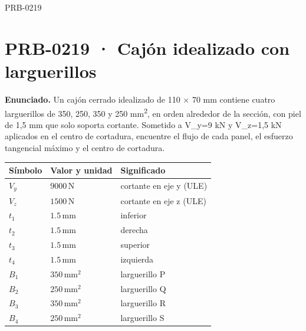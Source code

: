 \begin{studiumworked}{PRB-0219}

\section{PRB-0219 · Cajón idealizado con larguerillos}

\textbf{Enunciado.} Un cajón cerrado idealizado de 110 \ensuremath{\times} 70 mm contiene cuatro larguerillos de 350, 250, 350 y 250 mm\textsuperscript{2}, en orden alrededor de la sección, con piel de 1,5 mm que solo soporta cortante. Sometido a V\_y=9 kN y V\_z=1,5 kN aplicados en el centro de cortadura, encuentre el flujo de cada panel, el esfuerzo tangencial máximo y el centro de cortadura.

\par\medskip\noindent\begin{tabular}{@{}p{.18\linewidth}p{.26\linewidth}p{.48\linewidth}@{}}
\toprule Símbolo & Valor y unidad & Significado\\\midrule
$V_{y}$ & $9000\,\mathrm{N}$ & cortante en eje y (ULE)\\
$V_{z}$ & $1500\,\mathrm{N}$ & cortante en eje z (ULE)\\
$t_{1}$ & $1.5\,\mathrm{mm}$ & inferior\\
$t_{2}$ & $1.5\,\mathrm{mm}$ & derecha\\
$t_{3}$ & $1.5\,\mathrm{mm}$ & superior\\
$t_{4}$ & $1.5\,\mathrm{mm}$ & izquierda\\
$B_{1}$ & $350\,\mathrm{mm^2}$ & larguerillo P\\
$B_{2}$ & $250\,\mathrm{mm^2}$ & larguerillo Q\\
$B_{3}$ & $350\,\mathrm{mm^2}$ & larguerillo R\\
$B_{4}$ & $250\,\mathrm{mm^2}$ & larguerillo S\\
\bottomrule\end{tabular}\par\medskip


\end{studiumworked}
